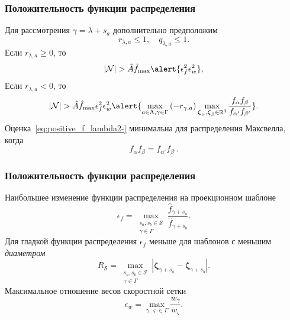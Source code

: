 \documentclass[mathserif]{beamer} %
\newcommand{\bzeta}{\boldsymbol{\zeta}}
\newcommand{\Nu}{\mathcal{N}}
\begin{document}
\begin{frame}
    \frametitle{Положительность функции распределения}
    Для рассмотрения \(\gamma = \lambda+s_a\) дополнительно предположим
    \begin{equation}\label{eq:normal_stencil}
        r_{\lambda,a} \leq 1, \quad q_{\lambda,a} \leq 1.
    \end{equation}
    Если \(r_{\lambda,a} \geq 0\), то
    \begin{equation}\label{eq:positive_f_lambda2+}
        |\Nu| > \hat{A} \hat{f}_{\max} \alert{ \epsilon_f^2 \epsilon_w^2 },
    \end{equation}
    Если \(r_{\lambda,a} < 0\), то
    \begin{equation}\label{eq:positive_f_lambda2-}
        |\Nu| > \hat{A} \hat{f}_{\max} \epsilon_f^2 \epsilon_w^2 \alert{
            \max_{a\in\Lambda,\gamma\in\Gamma}\left(-r_{\gamma,a}\right)
            \max_{\bzeta_\alpha,\bzeta_\beta\in\mathbb{R}^3}
            \frac{f_{\alpha}f_{\beta}}{f_{\alpha'}f_{\beta'}}
        }.
    \end{equation}
    Оценка~\eqref{eq:positive_f_lambda2-} минимальна для распределения Максвелла, когда
    \begin{equation}
        f_{\alpha}f_{\beta} = f_{\alpha'}f_{\beta'}.
    \end{equation}
\end{frame}

\begin{frame}
    \frametitle{Положительность функции распределения}
    Наибольшее изменение функции распределения на проекционном шаблоне
    \begin{equation}\label{eq:epsilon_f}
        \epsilon_f = \max_{\substack{s_a,s_b\in\mathcal{S}\\\gamma\in\Gamma}} \frac{\hat{f}_{\gamma+s_a}}{\hat{f}_{\gamma+s_b}}.
    \end{equation}
    Для гладкой функции распределения \(\epsilon_f\) меньше для шаблонов с меньшим \emph{диаметром}
    \begin{equation}\label{eq:stencil_diameter}
        R_\mathcal{S} = \max_{\substack{s_a,s_b\in\mathcal{S}\\\gamma\in\Gamma}}
            \left| \bzeta_{\gamma+s_a} - \bzeta_{\gamma+s_b} \right|.
    \end{equation}
    Максимальное отношение весов скоростной сетки
    \begin{equation}\label{eq:epsilon_w}
        \epsilon_w = \max_{\gamma,\varsigma\in\Gamma} \frac{w_\gamma}{w_\varsigma}.
    \end{equation}
\end{frame}
\end{document}
